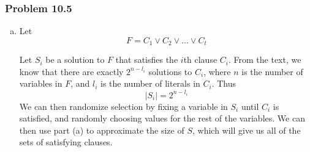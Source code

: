 \documentclass[12pt,letterpaper]{article}
\newenvironment{answer}[1]{
  \subsubsection*{Problem #1}
}{\newpage}
\begin{document}
\begin{answer}{10.5}
\begin{enumerate}[(a)]
	Similarly, if we set
		 $R = T/t \sum_{j=1}^t Q_i $
	Then
	$$ E[R] = T/t \sum_{j=1}^t E[Q_i] = E[Y] $$

	So the expectations of these new random variables remain the same. However, the distribution is not the same. The $Q_i$s are only located at the tail of $[0,1]$, rather than dispersed within the range. However, this means that the bound we find on $Q_i$ will be \emph{looser} than the bound on $K_i$, so we can still use it to bound $K_i$. So using Theorem 10.1, we find that we can find that the number of samples for an $(\epsilon, \delta)$ approximation is
		$$ t \ge \frac{3 \log{2/\delta}}{\epsilon^2 \mu} $$
	with $\mu = |S| / T$. We can bound this however by noting that
		$$ \frac{1}{m} \le \frac{|S|}{T} \le 1 $$

	So therefore
		$$ t \ge \frac{3m \log{2/\delta}}{\epsilon^2} $$

\item Let
	$$ F = C_1 \vee C_2 \vee \ldots \vee C_t $$

	Let $S_i$ be a solution to $F$ that satisfies the $i$th clause $C_i$. From the text, we know that there are exactly $2^{n-l_i}$ solutions to $C_i$, where $n$ is the number of variables in $F$, and $l_i$ is the number of literals in $C_i$. Thus
		$$|S_i| = 2^{n - l_i}$$
	We can then randomize selection by fixing a variable in $S_i$ until $C_i$ is satisfied, and randomly choosing values for the rest of the variables. We can then use part (a) to approximate the size of $S$, which will give us all of the sets of satisfying clauses.

\end{enumerate}
\end{answer}
\end{document}
